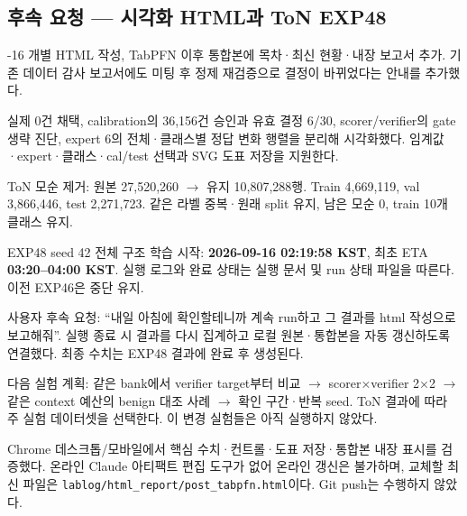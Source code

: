 \subsection{후속 요청 — 시각화 HTML과 ToN EXP48}
\par\noindent \textbullet{}-16 개별 HTML 작성, TabPFN 이후 통합본에 목차·최신 현황·내장 보고서 추가. 기존 데이터 감사 보고서에도 미팅 후 정제 재검증으로 결정이 바뀌었다는 안내를 추가했다.


\par\noindent \textbullet\enspace 실제 0건 채택, calibration의 36,156건 승인과 유효 결정 6/\allowbreak{}30, scorer/\allowbreak{}verifier의 gate 생략 진단, expert 6의 전체·클래스별 정답 변화 행렬을 분리해 시각화했다. 임계값·expert·클래스·cal/\allowbreak{}test 선택과 SVG 도표 저장을 지원한다.


\par\noindent \textbullet\enspace ToN 모순 제거: 원본 27,520,260  \ensuremath{\rightarrow}  유지 10,807,288행. Train 4,669,119, val 3,866,446, test 2,271,723. 같은 라벨 중복·원래 split 유지, 남은 모순 0, train 10개 클래스 유지.


\par\noindent \textbullet\enspace EXP48 seed 42 전체 구조 학습 시작: \textbf{2026-09-16 02:19:58 KST}, 최초 ETA \textbf{03:20–04:00 KST}. 실행 로그와 완료 상태는 실행 문서 및 run 상태 파일을 따른다. 이전 EXP46은 중단 유지.


\par\noindent \textbullet\enspace 사용자 후속 요청: “내일 아침에 확인할테니까 계속 run하고 그 결과를 html 작성으로 보고해줘”. 실행 종료 시 결과를 다시 집계하고 로컬 원본·통합본을 자동 갱신하도록 연결했다. 최종 수치는 EXP48 결과에 완료 후 생성된다.


\par\noindent \textbullet\enspace 다음 실험 계획: 같은 bank에서 verifier target부터 비교  \ensuremath{\rightarrow}  scorer×verifier 2×2  \ensuremath{\rightarrow}  같은 context 예산의 benign 대조 사례  \ensuremath{\rightarrow}  확인 구간·반복 seed. ToN 결과에 따라 주 실험 데이터셋을 선택한다. 이 변경 실험들은 아직 실행하지 않았다.


\par\noindent \textbullet\enspace Chrome 데스크톱/\allowbreak{}모바일에서 핵심 수치·컨트롤·도표 저장·통합본 내장 표시를 검증했다. 온라인 Claude 아티팩트 편집 도구가 없어 온라인 갱신은 불가하며, 교체할 최신 파일은 \texttt{lablog/\allowbreak{}\allowbreak{}h\allowbreak{}tml\_\allowbreak{}\allowbreak{}repo\allowbreak{}rt/\allowbreak{}\allowbreak{}post\_\allowbreak{}\allowbreak{}tabpfn.\allowbreak{}h\allowbreak{}tml}이다. Git push는 수행하지 않았다.



